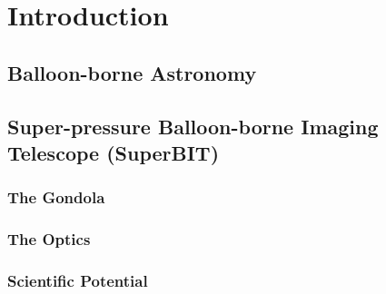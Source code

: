 \chapter{Introduction}

\section{Balloon-borne Astronomy}

\section{Super-pressure Balloon-borne Imaging Telescope (SuperBIT)}
\subsection{The Gondola}

\subsection{The Optics}

\subsection{Scientific Potential}
